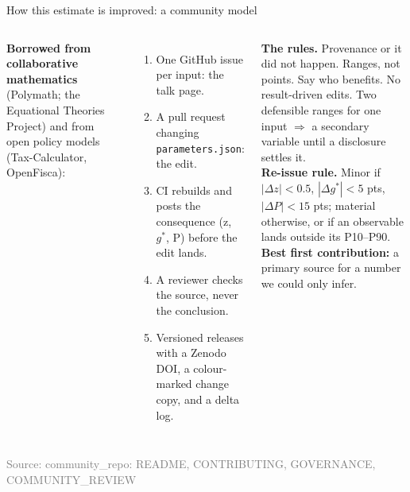 \documentclass[aspectratio=169,11pt]{beamer}
\newcommand{\src}[1]{\vfill\hfill{\scriptsize\textcolor{gray}{Source: #1}}}
\newcommand{\claim}[1]{\par\vspace{2pt}{\small\textcolor{accent}{#1}}\par}
\begin{document}
\begin{frame}[shrink=6]{How this estimate is improved: a community model}
\footnotesize
\claim{One object of record, small sourced contributions, machinery that checks them, collective credit.}
\begin{columns}[T]
\small
\textbf{Borrowed from collaborative mathematics} (Polymath; the Equational Theories Project) and from open policy models (Tax-Calculator, OpenFisca):
\begin{enumerate}
\item One GitHub issue per input: the talk page.
\item A pull request changing \texttt{parameters.json}: the edit.
\item CI rebuilds and posts the consequence (z, $g^{*}$, P) before the edit lands.
\item A reviewer checks the source, never the conclusion.
\item Versioned releases with a Zenodo DOI, a colour-marked change copy, and a delta log.
\end{enumerate}
\small
\textbf{The rules.} Provenance or it did not happen. Ranges, not points. Say who benefits. No result-driven edits. Two defensible ranges for one input $\Rightarrow$ a secondary variable until a disclosure settles it.\\[6pt]
\textbf{Re-issue rule.} Minor if $|\Delta z|<0.5$, $|\Delta g^{*}|<5$ pts, $|\Delta P|<15$ pts; material otherwise, or if an observable lands outside its P10--P90.\\[8pt]
\textbf{Best first contribution:} a primary source for a number we could only infer.
\end{columns}
\src{community\_repo: README, CONTRIBUTING, GOVERNANCE, COMMUNITY\_REVIEW}
\end{frame}
\end{document}
